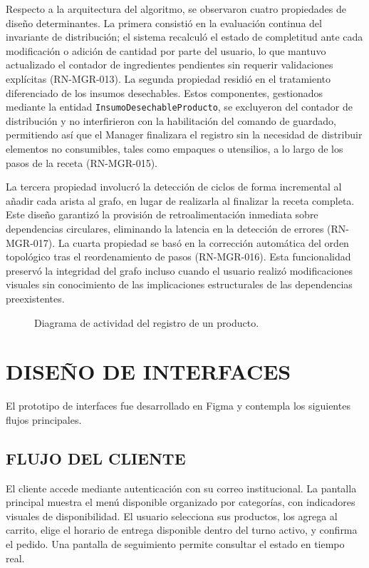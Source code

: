 Respecto a la arquitectura del algoritmo, se observaron cuatro propiedades de diseño determinantes. La primera consistió en la evaluación continua del invariante de distribución; el sistema recalculó el estado de completitud ante cada modificación o adición de cantidad por parte del usuario, lo que mantuvo actualizado el contador de ingredientes pendientes sin requerir validaciones explícitas (RN-MGR-013). La segunda propiedad residió en el tratamiento diferenciado de los insumos desechables. Estos componentes, gestionados mediante la entidad \texttt{InsumoDesechableProducto}, se excluyeron del contador de distribución y no interfirieron con la habilitación del comando de guardado, permitiendo así que el Manager finalizara el registro sin la necesidad de distribuir elementos no consumibles, tales como empaques o utensilios, a lo largo de los pasos de la receta (RN-MGR-015).

La tercera propiedad involucró la detección de ciclos de forma incremental al añadir cada arista al grafo, en lugar de realizarla al finalizar la receta completa. Este diseño garantizó la provisión de retroalimentación inmediata sobre dependencias circulares, eliminando la latencia en la detección de errores (RN-MGR-017). La cuarta propiedad se basó en la corrección automática del orden topológico tras el reordenamiento de pasos (RN-MGR-016). Esta funcionalidad preservó la integridad del grafo incluso cuando el usuario realizó modificaciones visuales sin conocimiento de las implicaciones estructurales de las dependencias preexistentes.

\begin{figure}[H]
    \centering
    
    \caption{Diagrama de actividad del registro de un producto.}
    \label{fig:diagrama-actividad-registro-producto}
\end{figure}

\section{DISEÑO DE INTERFACES}
El prototipo de interfaces fue desarrollado en Figma y contempla los siguientes flujos principales. 

\subsection{FLUJO DEL CLIENTE}
El cliente accede mediante autenticación con su correo institucional. La pantalla principal muestra el menú disponible organizado por categorías, con indicadores visuales de disponibilidad. El usuario selecciona sus productos, los agrega al carrito, elige el horario de entrega disponible dentro del turno activo, y confirma el pedido. Una pantalla de seguimiento permite consultar el estado en tiempo real.


